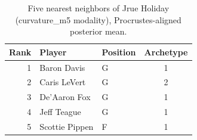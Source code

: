 \begin{table}[htbp]
  \centering\small
  \begin{tabular}{rllc}
    \toprule
    Rank & Player & Position & Archetype \\
    \midrule
    1 & Baron Davis & G & 1 \\
    2 & Caris LeVert & G & 2 \\
    3 & De'Aaron Fox & G & 1 \\
    4 & Jeff Teague & G & 1 \\
    5 & Scottie Pippen & F & 1 \\
    \bottomrule
  \end{tabular}
  \caption{Five nearest neighbors of Jrue Holiday (curvature_m5 modality), Procrustes-aligned posterior mean.}
  \label{tab:Jrue_Holiday_neighbors_curvature_m5}
\end{table}

